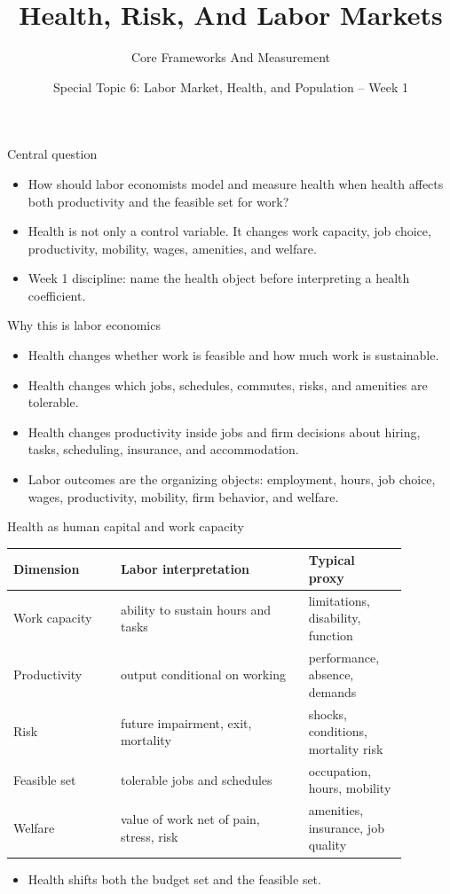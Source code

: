 \documentclass[aspectratio=169,11pt]{beamer}
\title{Health, Risk, And Labor Markets}
\subtitle{Core Frameworks And Measurement}
\author{Special Topic 6: Labor Market, Health, and Population -- Week 1}
\date{}
\begin{document}
\begin{frame}
  \titlepage
\end{frame}

\begin{frame}{Central question}
\begin{itemize}
    \item How should labor economists model and measure health when health affects both productivity and the feasible set for work?
    \item Health is not only a control variable. It changes work capacity, job choice, productivity, mobility, wages, amenities, and welfare.
    \item Week 1 discipline: name the health object before interpreting a health coefficient.
\end{itemize}
\end{frame}

\begin{frame}{Why this is labor economics}
\begin{itemize}
    \item Health changes whether work is feasible and how much work is sustainable.
    \item Health changes which jobs, schedules, commutes, risks, and amenities are tolerable.
    \item Health changes productivity inside jobs and firm decisions about hiring, tasks, scheduling, insurance, and accommodation.
    \item Labor outcomes are the organizing objects: employment, hours, job choice, wages, productivity, mobility, firm behavior, and welfare.
\end{itemize}
\end{frame}

\begin{frame}{Health as human capital and work capacity}
\small
\begin{tabular}{p{0.24\linewidth} p{0.42\linewidth} p{0.22\linewidth}}
\toprule
Dimension & Labor interpretation & Typical proxy \\
\midrule
Work capacity & ability to sustain hours and tasks & limitations, disability, function \\
Productivity & output conditional on working & performance, absence, demands \\
Risk & future impairment, exit, mortality & shocks, conditions, mortality risk \\
Feasible set & tolerable jobs and schedules & occupation, hours, mobility \\
Welfare & value of work net of pain, stress, risk & amenities, insurance, job quality \\
\bottomrule
\end{tabular}
\vspace{0.3cm}
\begin{itemize}
    \item Health shifts both the budget set and the feasible set.
\end{itemize}
\end{frame}
\end{document}
